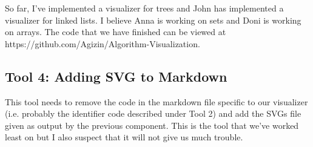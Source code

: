 \documentclass[12pt]{article}
\begin{document}
So far, I've implemented a visualizer for trees and John has implemented a visualizer for linked lists. I believe Anna is working on sets and Doni is working on arrays. The code that we have finished can be viewed at https://github.com/Agizin/Algorithm-Visualization.

\subsection*{Tool 4: Adding SVG to Markdown}
This tool needs to remove the code in the markdown file specific to our visualizer (i.e. probably the identifier code described under Tool 2) and add the SVGs file given as output by the previous component. This is the tool that we've worked least on but I also suspect that it will not give us much trouble. 
\end{document}
